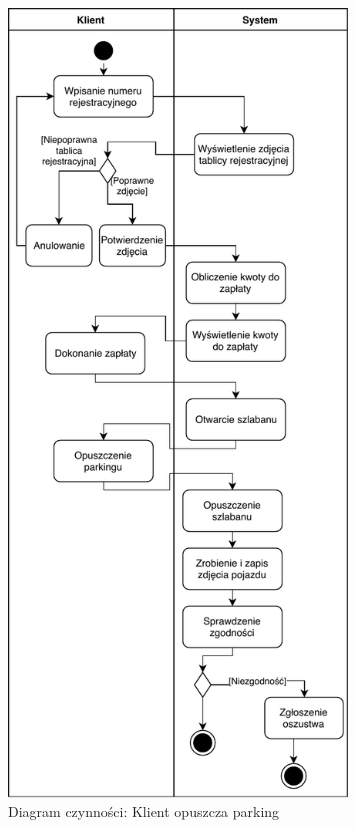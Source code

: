 \begin{figure}[H]
	\centering
	\includegraphics[width=90mm]{diagramy/DiagCzynWyjazd.pdf}
	\caption{Diagram czynności: Klient opuszcza parking \label{overflow}}
\end{figure}



